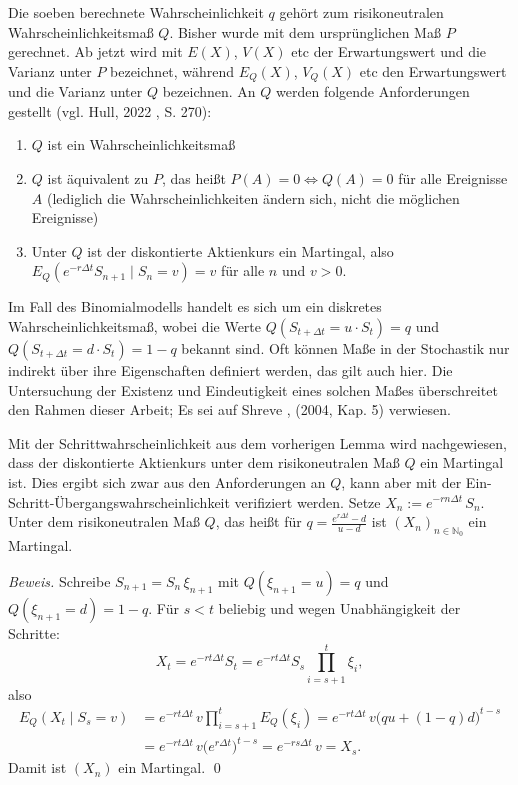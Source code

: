 \begin{defi}
Die soeben berechnete Wahrscheinlichkeit $q$ gehört zum risikoneutralen Wahrscheinlichkeitsmaß $Q$.
Bisher wurde mit dem ursprünglichen Maß $P$ gerechnet. Ab jetzt wird mit $E(X)$, $V(X)$ etc der Erwartungswert
und die Varianz unter $P$ bezeichnet, während $E_Q(X)$, $V_Q(X)$ etc den Erwartungswert und die Varianz unter $Q$
bezeichnen. An $Q$ werden folgende Anforderungen gestellt (vgl. Hull, 2022 \cite{hull}, S. 270):
\begin{enumerate}
    \item $Q$ ist ein Wahrscheinlichkeitsmaß
    \item $Q$ ist äquivalent zu $P$, das heißt $P(A)=0 \iff Q(A)=0$ für alle Ereignisse $A$ (lediglich die Wahrscheinlichkeiten ändern sich, nicht die möglichen Ereignisse)
    \item Unter $Q$ ist der diskontierte Aktienkurs ein Martingal, also $E_Q(e^{-r \Delta t} S_{n+1} \mid S_n = v) = v$ für alle $n$ und $v>0$.
\end{enumerate}
Im Fall des Binomialmodells handelt es sich um ein diskretes Wahrscheinlichkeitsmaß, 
wobei die Werte $Q(S_{t + \Delta t} = u \cdot S_t)=q$ und $Q(S_{t + \Delta t} = d \cdot S_t)=1-q$ bekannt sind.
Oft können Maße in der Stochastik nur indirekt über ihre Eigenschaften definiert werden, das gilt auch hier. Die Untersuchung der Existenz und Eindeutigkeit eines solchen Maßes überschreitet den Rahmen dieser Arbeit; Es sei auf Shreve \cite{shreve}, (2004, Kap. 5) verwiesen.
\end{defi}

\begin{lemma}
Mit der Schrittwahrscheinlichkeit aus dem vorherigen Lemma wird nachgewiesen,
dass der diskontierte Aktienkurs unter dem risikoneutralen Maß $Q$ ein Martingal ist. Dies ergibt sich zwar aus den Anforderungen 
an $Q$, kann aber mit der Ein-Schritt-Übergangswahrscheinlichkeit verifiziert werden.
Setze $X_n := e^{-r n \Delta t}\, S_n$. Unter dem risikoneutralen Maß $Q$, das heißt für 
$q=\frac{e^{r\Delta t}-d}{u-d}$ ist $(X_n)_{n\in\mathbb N_0}$ ein Martingal.

\textit{Beweis.} Schreibe $S_{n+1}=S_n\,\xi_{n+1}$ mit 
$Q(\xi_{n+1}=u)=q$ und $Q(\xi_{n+1}=d)=1-q$. 
Für $s<t$ beliebig und wegen Unabhängigkeit der Schritte:
$$
X_t
= e^{-rt\Delta t} S_t
= e^{-rt\Delta t} S_s \prod_{i=s+1}^{t} \xi_i,
$$
also
$$
\begin{aligned}
E_Q(X_t\mid S_s=v)
&= e^{-rt\Delta t}\, v \prod_{i=s+1}^{t} E_Q(\xi_i)
= e^{-rt\Delta t}\, v \big(q u + (1-q)d\big)^{t-s} \\
&= e^{-rt\Delta t}\, v \big(e^{r\Delta t}\big)^{t-s}
= e^{-rs\Delta t}\, v
= X_s.
\end{aligned}
$$
Damit ist $(X_n)$ ein Martingal. \qed
\end{lemma}

